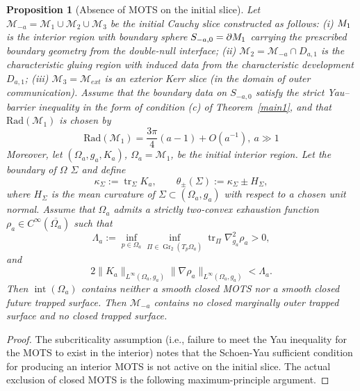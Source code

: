 \documentclass{amsart}
\newtheorem{proposition}{Proposition}[section]
\begin{document}
{\begin{proposition}[Absence of MOTS on the initial slice]
\label{prop:noMOTS-initial-slice}
Let $\mathcal M_{-a}=\mathcal{M}_{1}\cup \mathcal M_2\cup \mathcal M_3$ be the initial Cauchy slice constructed as follows:
(i) $\mathcal \mathcal{M}_{1}$ is the interior region with boundary sphere $S_{-a,0}=\partial\mathcal \mathcal{M}_{1}$ carrying the prescribed boundary geometry from the double-null interface;
(ii) $\mathcal{M}_2=\mathcal M_{-a}\cap D_{a,1}$ is the characteristic gluing region with induced data from the characteristic development $D_{a,1}$;
(iii) $\mathcal M_3=\mathcal M_{ext}$ is an exterior Kerr slice (in the domain of outer communication).
Assume that the boundary data on $S_{-a,0}$ satisfy the strict Yau--barrier inequality in the form of condition {\rm(c)} of Theorem~\ref{main1}, and that $\text{Rad}(\mathcal{M}_{1})$ is chosen by
\begin{equation}\label{eq:achoice}
 \text{Rad}(\mathcal{M}_{1})=\frac{3\pi}{4}(a-1)+O(a^{-1}),~a\gg1
\end{equation}
Moreover, let \((\Omega_a,g_a,K_a)\), \(\Omega_a=\mathcal M_1\), be the initial
interior region. Let the boundary of $\Omega$ $\Sigma$ and define
\[
        \kappa_\Sigma:=\operatorname{tr}_{\Sigma}K_a,
        \qquad
        \theta_\pm(\Sigma):=\kappa_\Sigma\pm H_\Sigma,
\]
where \(H_\Sigma\) is the mean curvature of \(\Sigma\subset(\Omega_a,g_a)\)
with respect to a chosen unit normal.
\noindent Assume that \(\Omega_a\) admits a strictly two-convex
exhaustion function \(\rho_a\in C^\infty(\overline{\Omega_a})\) such
that
\begin{equation}
\label{eq:two-convex-exhaustion}
        \Lambda_a
        :=
        \inf_{p\in\Omega_a}
        \inf_{\Pi\in \operatorname{Gr}_2(T_p\Omega_a)}
        \operatorname{tr}_{\Pi}\nabla^2_{g_a}\rho_a
        >0,
\end{equation}
and
\begin{equation}
\label{eq:K-small-barrier}
        2\|K_a\|_{L^\infty(\Omega_a,g_a)}
        \|\nabla\rho_a\|_{L^\infty(\Omega_a,g_a)}
        <
        \Lambda_a .
\end{equation}
Then \(\operatorname{int}(\Omega_a)\) contains neither a smooth closed
MOTS nor a smooth closed future trapped surface.
Then $\mathcal M_{-a}$ contains no closed marginally outer trapped surface and no closed trapped surface.
\end{proposition}




\begin{proof}
The subcriticality assumption (i.e., failure to meet the Yau inequality for the MOTS to exist in the interior) notes that
the Schoen-Yau sufficient condition for producing an interior MOTS is
not active on the initial slice. The actual exclusion of closed MOTS is
the following maximum-principle argument.


\end{proof}}
\end{document}
